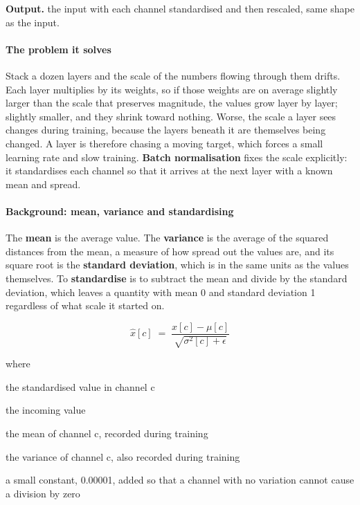 \noindent\textbf{Output.} the input with each channel standardised and then rescaled, same shape as the input.


\paragraph{The problem it solves}
Stack a dozen layers and the scale of the numbers flowing through them drifts. Each layer multiplies by its weights, so if those weights are on average slightly larger than the scale that preserves magnitude, the values grow layer by layer; slightly smaller, and they shrink toward nothing. Worse, the scale a layer sees changes during training, because the layers beneath it are themselves being changed. A layer is therefore chasing a moving target, which forces a small learning rate and slow training. \textbf{Batch normalisation} \cite{ioffe2015} fixes the scale explicitly: it standardises each channel so that it arrives at the next layer with a known mean and spread.


\paragraph{Background: mean, variance and standardising}
The \textbf{mean} is the average value. The \textbf{variance} is the average of the squared distances from the mean, a measure of how spread out the values are, and its square root is the \textbf{standard deviation}, which is in the same units as the values themselves. To \textbf{standardise} is to subtract the mean and divide by the standard deviation, which leaves a quantity with mean 0 and standard deviation 1 regardless of what scale it started on.


\begin{equation}
\hat{x}[c] \;=\; \frac{x[c] - \mu[c]}{\sqrt{\sigma^{2}[c] + \epsilon}}
\end{equation}

\noindent where
\begin{description}[leftmargin=2.4em,style=nextline,font=\normalfont\ttfamily]\setlength\itemsep{1pt}
  \item[{$\hat{x}[c]$}] \normalfont the standardised value in channel c
  \item[{$x[c]$}] \normalfont the incoming value
  \item[{$\mu[c]$}] \normalfont the mean of channel c, recorded during training
  \item[{$\sigma^{2}[c]$}] \normalfont the variance of channel c, also recorded during training
  \item[{$\epsilon$}] \normalfont a small constant, 0.00001, added so that a channel with no variation cannot cause a division by zero
\end{description}


